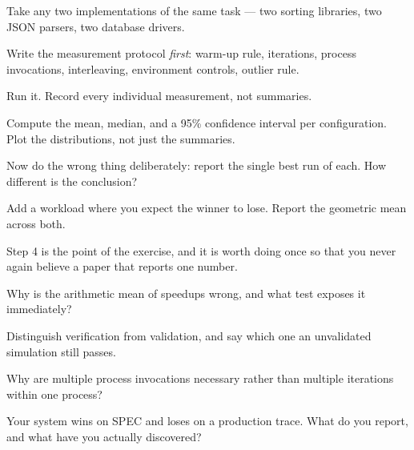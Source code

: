\begin{lab}
Take any two implementations of the same task --- two sorting libraries, two
JSON parsers, two database drivers.

\begin{tightnum}
  \item Write the measurement protocol \emph{first}: warm-up rule, iterations,
    process invocations, interleaving, environment controls, outlier rule.
  \item Run it. Record every individual measurement, not summaries.
  \item Compute the mean, median, and a 95\% confidence interval per
    configuration. Plot the distributions, not just the summaries.
  \item Now do the wrong thing deliberately: report the single best run of
    each. How different is the conclusion?
  \item Add a workload where you expect the winner to lose. Report the
    geometric mean across both.
\end{tightnum}

\medskip
Step 4 is the point of the exercise, and it is worth doing once so that you
never again believe a paper that reports one number.
\end{lab}

\begin{checkpoint}
\begin{tightnum}
  \item Why is the arithmetic mean of speedups wrong, and what test exposes it
    immediately?
  \item Distinguish verification from validation, and say which one an
    unvalidated simulation still passes.
  \item Why are multiple process invocations necessary rather than multiple
    iterations within one process?
  \item Your system wins on SPEC and loses on a production trace. What do you
    report, and what have you actually discovered?
\end{tightnum}
\end{checkpoint}

